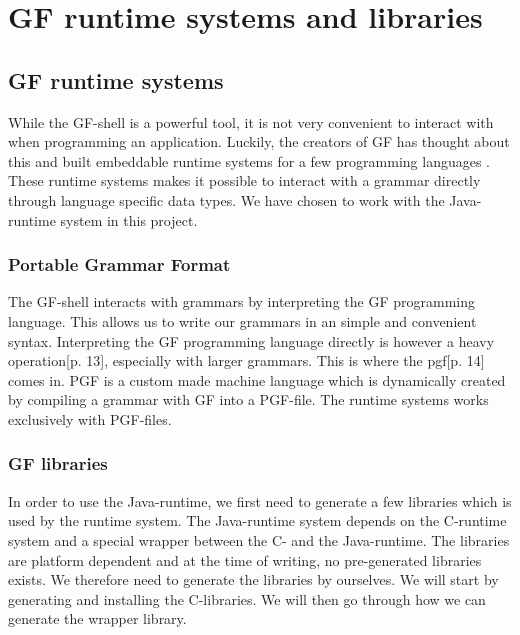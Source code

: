 \chapter{GF runtime systems and libraries}\label{ch:appendix-a}

\section{GF runtime systems}

While the GF-shell is a powerful tool, it is not very convenient to interact with when programming an application. Luckily, the creators of GF has thought about this and built embeddable runtime systems for a few programming languages \cite[p. 3]{angelov:2011}. These runtime systems makes it possible to interact with a grammar directly through language specific data types. We have chosen to work with the Java-runtime system in this project.

\subsection{Portable Grammar Format}
The GF-shell interacts with grammars by interpreting the GF programming language. This allows us to write our grammars in an simple and convenient syntax. Interpreting the GF programming language directly is however a heavy operation\cite{angelov:2011}[p. 13], especially with larger grammars. This is where the \ac{pgf}\cite{angelov:2011}[p. 14] comes in. PGF is a custom made machine language which is dynamically created by compiling a grammar with GF into a PGF-file. The runtime systems works exclusively with PGF-files.

\subsection{GF libraries}
In order to use the Java-runtime, we first need to generate a few libraries which is used by the runtime system. The Java-runtime system depends on the C-runtime system and a special wrapper between the C- and the Java-runtime. The libraries are platform dependent and at the time of writing, no pre-generated libraries exists. We therefore need to generate the libraries by ourselves. We will start by generating and installing the C-libraries. We will then go through how we can generate the wrapper library.

